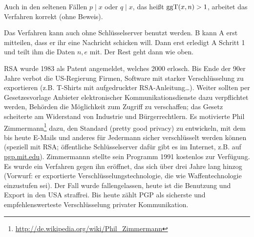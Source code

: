 \begin{bem}
	Auch in den seltenen Fällen $p \mid x$ oder $q \mid x$, das heißt $\operatorname{ggT}(x,n) > 1$, arbeitet das Verfahren korrekt (ohne Beweis).
\end{bem}

\begin{bem}
	Das Verfahren kann auch ohne Schlüsselserver benutzt werden. 
	B kann A erst mitteilen, dass er ihr eine Nachricht schicken will. 
	Dann erst erledigt A Schritt 1 und teilt ihm die Daten $n,e$ mit. 
	Der Rest geht dann wie oben.
\end{bem}

\begin{bem}
	RSA wurde 1983 als Patent angemeldet, welches 2000 erlosch. 
	Bis Ende der 90er Jahre verbot die US-Regierung Firmen, Software mit starker Verschlüsselung zu exportieren (z.B. T-Shirts mit aufgedruckter RSA-Anleitung\dots). 
	Weiter sollten per Gesetzesvorlage Anbieter elektronischer Kommunikationsdienste dazu verpflichtet werden, Behörden die Möglichkeit zum Zugriff zu verschaffen; das Gesetz scheiterte am Widerstand von Industrie und Bürgerrechtlern. 
	Es motivierte Phil Zimmermann\footnote{\url{http://de.wikipedia.org/wiki/Phil_Zimmermann}} dazu, den Standard  (pretty good privacy) zu entwickeln, mit dem bis heute E-Mails und anderes für Jedermann sicher verschlüsselt werden können (speziell mit RSA; öffentliche Schlüsselserver dafür gibt es im Internet, z.B. auf \href{http://pgp.mit.edu}{pgp.mit.edu}). 
	Zimmermannn stellte sein Programm 1991 kostenlos zur Verfügung. 
	Es wurde ein Verfahren gegen ihn eröffnet, das sich über drei Jahre lang hinzog (Vorwurf: er exportierte Verschlüsselungstechnologie, die wie Waffentechnologie einzustufen sei).
	Der Fall wurde fallengelassen, heute ist die Benutzung und Export in den USA straffrei. 
	Bis heute zählt PGP als sicherste und empfehlenswerteste Verschlüsselung privater Kommunikation.
\end{bem}

